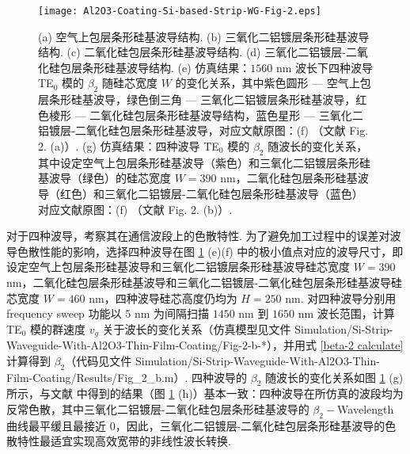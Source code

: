 \documentclass[zh]{assignment}
\begin{document}
\begin{figure}[ht]
    \centering
    \texttt{[image: Al2O3-Coating-Si-based-Strip-WG-Fig-2.eps]}
    \caption{(a) 空气上包层条形硅基波导结构. (b) 三氧化二铝镀层条形硅基波导结构. (c) 二氧化硅包层条形硅基波导结构. (d) 三氧化二铝镀层-二氧化硅包层条形硅基波导结构. (e) 仿真结果：$1560$ nm 波长下四种波导 TE$_0$ 模的 $\beta_2$ 随硅芯宽度 $W$ 的变化关系，其中紫色圆形 --- 空气上包层条形硅基波导，绿色倒三角 --- 三氧化二铝镀层条形硅基波导，红色棱形 --- 二氧化硅包层条形硅基波导结构，蓝色星形 --- 三氧化二铝镀层-二氧化硅包层条形硅基波导，对应文献原图：(f) （文献 \cite{guo2018experimentally} Fig. 2. (a)）. (g) 仿真结果：四种波导 TE$_0$ 模的 $\beta_2$ 随波长的变化关系，其中设定空气上包层条形硅基波导（紫色）和三氧化二铝镀层条形硅基波导（绿色）的硅芯宽度 $W=390$ nm，二氧化硅包层条形硅基波导（红色）和三氧化二铝镀层-二氧化硅包层条形硅基波导（蓝色）对应文献原图：(f) （文献 \cite{guo2018experimentally} Fig. 2. (b)）.}
    \label{Al2O3-Coating-Si-based-Strip-WG-Fig-2}
\end{figure}

对于四种波导，考察其在通信波段上的色散特性. 为了避免加工过程中的误差对波导色散性能的影响，选择四种波导在图 \ref{Al2O3-Coating-Si-based-Strip-WG-Fig-2} (e)(f) 中的极小值点对应的波导尺寸，即设定空气上包层条形硅基波导和三氧化二铝镀层条形硅基波导硅芯宽度 $W=390$ nm，二氧化硅包层条形硅基波导和三氧化二铝镀层-二氧化硅包层条形硅基波导硅芯宽度 $W=460$ nm，四种波导硅芯高度仍均为 $H=250$ nm. 对四种波导分别用 frequency sweep 功能以 $5$ nm 为间隔扫描 $1450$ nm 到 $1650$ nm 波长范围，计算 TE$_0$ 模的群速度 $v_g$ 关于波长的变化关系（仿真模型见文件 Simulation/Si-Strip-Waveguide-With-Al2O3-Thin-Film-Coating/Fig-2-b-*），并用式 \eqref{beta-2 calculate} 计算得到 $\beta_2$（代码见文件 Simulation/Si-Strip-Waveguide-With-Al2O3-Thin-Film-Coating/Results/Fig\_2\_b.m）. 四种波导的 $\beta_2$ 随波长的变化关系如图 \ref{Al2O3-Coating-Si-based-Strip-WG-Fig-2} (g) 所示，与文献 \cite{guo2018experimentally} 中得到的结果（图 \ref{Al2O3-Coating-Si-based-Strip-WG-Fig-2} (h)）基本一致：四种波导在所仿真的波段均为反常色散，其中三氧化二铝镀层-二氧化硅包层条形硅基波导的 $\beta_2-$Wavelength 曲线最平缓且最接近 $0$，因此，三氧化二铝镀层-二氧化硅包层条形硅基波导的色散特性最适宜实现高效宽带的非线性波长转换.
\end{document}
